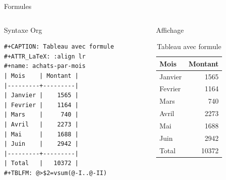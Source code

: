 \documentclass[presentation,t]{beamer}
\begin{document}
\begin{frame}[fragile,label={sec:orgaf12609}]{Formules}
 \begin{columns}
\begin{column}{0.55\columnwidth}
Syntaxe Org

\lstset{language=org,label=orgdcd386c,caption= ,captionpos=b,numbers=none}
\begin{lstlisting}
#+CAPTION: Tableau avec formule
#+ATTR_LaTeX: :align lr
#+name: achats-par-mois
| Mois    | Montant |
|---------+---------|
| Janvier |    1565 |
| Fevrier |    1164 |
| Mars    |     740 |
| Avril   |    2273 |
| Mai     |    1688 |
| Juin    |    2942 |
|---------+---------|
| Total   |   10372 |
#+TBLFM: @>$2=vsum(@-I..@-II)
\end{lstlisting}
\end{column}

\begin{column}{0.42\columnwidth}
Affichage

\begin{mdframed}
\begin{table}[!htbp]
\caption{\label{achats-par-mois}Tableau avec formule}
\centering
\begin{tabular}{lr}
Mois & Montant\\
\hline
Janvier & 1565\\
Fevrier & 1164\\
Mars & 740\\
Avril & 2273\\
Mai & 1688\\
Juin & 2942\\
\hline
Total & 10372\\
\end{tabular}
\end{table}

\end{mdframed}
\end{column}
\end{columns}
\end{frame}
\end{document}
